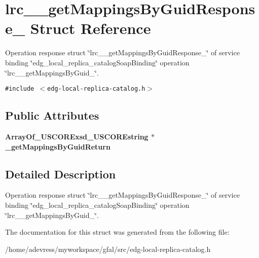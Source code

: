 \section{lrc\_\-\_\-get\-Mappings\-By\-Guid\-Response\_\- Struct Reference}
\label{structlrc____getMappingsByGuidResponse__}
Operation response struct \char`\"{}lrc\_\-\_\-get\-Mappings\-By\-Guid\-Response\_\-\char`\"{} of service binding \char`\"{}edg\_\-local\_\-replica\_\-catalog\-Soap\-Binding\char`\"{} operation \char`\"{}lrc\_\-\_\-get\-Mappings\-By\-Guid\_\-\char`\"{}.  


{\tt \#include $<$edg-local-replica-catalog.h$>$}

\subsection*{Public Attributes}
\begin{CompactItemize}
\item 
\bf{Array\-Of\_\-USCORExsd\_\-USCOREstring} $\ast$ \textbf{\_\-get\-Mappings\-By\-Guid\-Return}\label{structlrc____getMappingsByGuidResponse___59fe769ddf289386a0092cb927847282}

\end{CompactItemize}


\subsection{Detailed Description}
Operation response struct \char`\"{}lrc\_\-\_\-get\-Mappings\-By\-Guid\-Response\_\-\char`\"{} of service binding \char`\"{}edg\_\-local\_\-replica\_\-catalog\-Soap\-Binding\char`\"{} operation \char`\"{}lrc\_\-\_\-get\-Mappings\-By\-Guid\_\-\char`\"{}. 



The documentation for this struct was generated from the following file:\begin{CompactItemize}
\item 
/home/adevress/myworkspace/gfal/src/edg-local-replica-catalog.h\end{CompactItemize}
